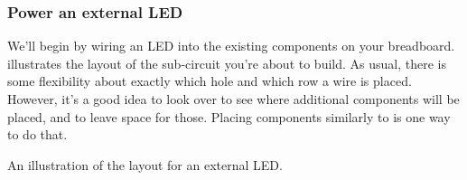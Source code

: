 \subsubsection{\howto Power an external LED}
We'll begin by wiring an LED into the existing components on your breadboard. 
 illustrates the layout of the sub-circuit you're about to build.
As usual, there is some flexibility about exactly which hole and which row a wire is placed. 
However, it's a good idea to look over  to see where additional components will be placed, and to leave space for those.
Placing components similarly to  is one way to do that. 
\begin{marginfigure}[-10cm]
	\begin{center}
		\caption[Button connections schematic]{An illustration of the layout for an external LED. }
	\end{center}
\end{marginfigure}


